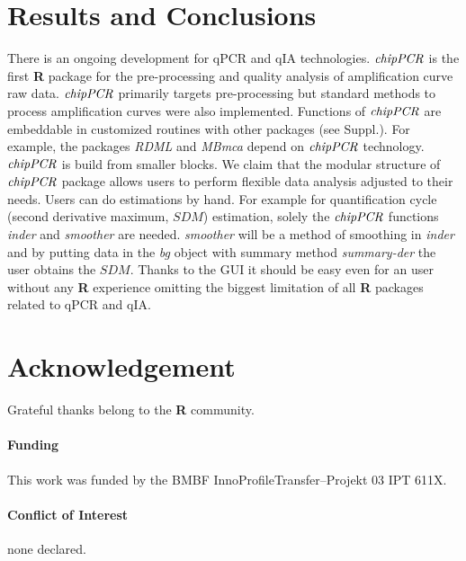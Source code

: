 \documentclass{bioinfo}
\begin{document}
\section{Results and Conclusions}

There is an ongoing development for qPCR and qIA technologies. $\emph{chipPCR}$ 
is the first \textbf{R} package for the pre-processing and quality 
analysis of amplification curve raw data. $\emph{chipPCR}$ 
primarily targets pre-processing but standard methods to process 
amplification curves were also implemented. Functions of $\emph{chipPCR}$ are embeddable in 
customized routines with other packages (see Suppl.). For example, the packages 
\emph{RDML} and \emph{MBmca} depend on $\emph{chipPCR}$ technology. 
$\emph{chipPCR}$ is build from smaller blocks. We claim that the modular 
structure of $\emph{chipPCR}$ package allows users to perform flexible data 
analysis adjusted to their needs. Users can do estimations by hand. For example 
for quantification cycle (second derivative maximum, $SDM$) estimation, solely 
the $\emph{chipPCR}$ functions \textsl{inder} and \textsl{smoother} are needed. 
\textsl{smoother} will be a method of smoothing in \textsl{inder} and by putting 
data in the \textsl{bg} object with summary method \textsl{summary-der} the user 
obtains the $SDM$. Thanks to the GUI it should be easy even for an user without 
any \textbf{R} experience omitting the biggest limitation of all \textbf{R} 
packages related to qPCR and qIA.


\section*{Acknowledgement}
Grateful thanks belong to the \textbf{R} community.

\paragraph{Funding\textcolon} This work was funded by the BMBF InnoProfileTransfer--Projekt 03 IPT 611X.

\paragraph{Conflict of Interest\textcolon} none declared.



%
%
%
%
%
%
%

\end{document}

